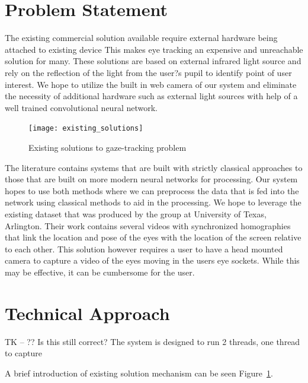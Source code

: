 \documentclass[10pt,twocolumn,letterpaper]{article}
\begin{document}
\section{Problem Statement}
The existing commercial solution available require external hardware
being attached to existing device\cite{eyetrackerlist}\cite{tobii_1} This makes eye tracking an
expensive and unreachable solution for many. These solutions are based
on external infrared light source and rely on the reflection of the
light from the user?s pupil to identify point of user interest. We hope to
utilize the built in web camera of our system and eliminate the necessity
of additional hardware such as external light sources with help of a
well trained convolutional neural network.


\begin{figure}
  \begin{center}
    \texttt{[image: existing\_solutions]}
  \end{center}
  \caption{Existing solutions to gaze-tracking problem}
  \label{fig:existsol}
  \end{figure}

The literature contains systems that are built with strictly classical
approaches to those that are built on more modern neural networks for
processing\cite{krafka}\cite{mcmurrough}\cite{weidenbacher}\cite{baluja}\cite{cazzato}\cite{li}. Our
system hopes to use both methods where we can preprocess the data that
is fed into the network using classical methods to aid in the
processing. We hope to leverage the existing dataset that was produced
by the group at University of Texas, Arlington\cite{mcmurrough}. Their
work contains several videos with synchronized homographies that link
the location and pose of the eyes with the location of the screen
relative to each other. This solution however requires a user to have
a head mounted camera to capture a video of the eyes moving in the
users eye sockets. While this may be effective, it can be cumbersome
for the user.


\section{Technical Approach}
TK -- ?? Is this still correct?
The system is designed to run 2 threads, one thread to capture 


A brief introduction of existing solution mechanism can be seen Figure~\ref{fig:existsol}.
\end{document}
